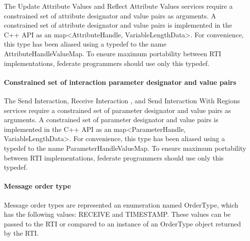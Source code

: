 \begin{compactstdpage}
    The Update Attribute Values and Reflect Attribute Values \rtiinitiated{} services require a constrained set of attribute designator and value pairs as arguments. A constrained set of attribute designator and value pairs is implemented in the C++ API as an map\textless{}AttributeHandle, VariableLengthData\textgreater{}. For convenience, this type has been aliased using a typedef to the name AttributeHandleValueMap. To ensure maximum portability between RTI implementations, federate programmers should use only this typedef.

    \paragraph{Constrained set of interaction parameter designator and value pairs}

    The Send Interaction, Receive Interaction \rtiinitiated{}, and Send Interaction With Regions services require a constrained set of parameter designator and value pairs as arguments. A constrained set of parameter designator and value pairs is implemented in the C++ API as an map\textless{}ParameterHandle, VariableLengthData\textgreater{}. For convenience, this type has been aliased using a typedef to the name ParameterHandleValueMap. To ensure maximum portability between RTI implementations, federate programmers should use only this typedef.

    \paragraph{Message order type}

    Message order types are represented an enumeration named OrderType, which has the following values: RECEIVE and TIMESTAMP. These values can be passed to the RTI or compared to an instance of an OrderType object returned by the RTI.

\end{compactstdpage}

\clearpage

